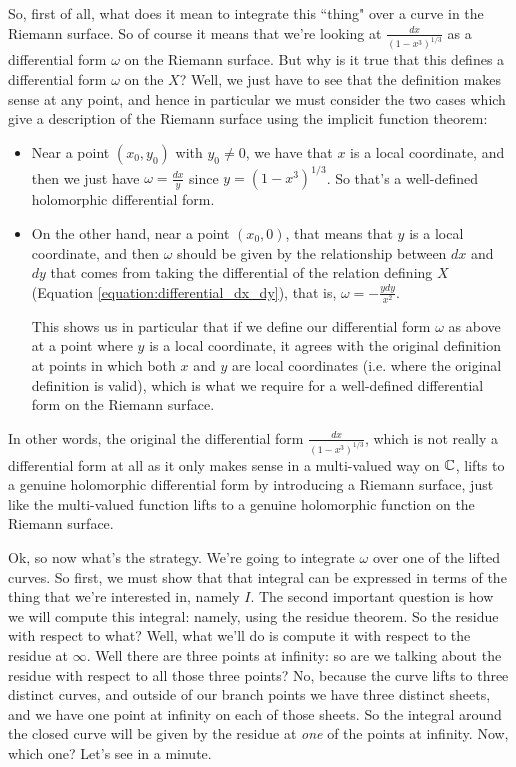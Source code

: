 \documentclass{article}
\begin{document}
So, first of all, what does it mean to integrate this ``thing" over a curve in the Riemann surface. So of course it means that we're looking at \(\frac{dx}{(1 - x^3)^{1/3}}\) as a differential form \(\omega\) on the Riemann surface. But why is it true that this defines a differential form \(\omega\) on the \(X\)? Well, we just have to see that the definition makes sense at any point, and hence in particular we must consider the two cases which give a description of the Riemann surface using the implicit function theorem:
\begin{itemize}

  \item Near a point \((x_0, y_0)\) with \(y_0 \neq 0\), we have that \(x\) is a local coordinate, and then we just have \(\omega = \frac{dx}{y}\) since \(y = (1 - x^3)^{1/3}\). So that's a well-defined holomorphic differential form.

  \item On the other hand, near a point \((x_0, 0)\), that means that \(y\) is a local coordinate, and then \(\omega\) should be given by the relationship between \(dx\) and \(dy\) that comes from taking the differential of the relation defining \(X\) (Equation \ref{equation:differential_dx_dy}), that is, \(\omega = -\frac{ydy}{x^2}\).

  This shows us in particular that if we define our differential form \(\omega\) as above at a point where \(y\) is a local coordinate, it agrees with the original definition at points in which both \(x\) and \(y\) are local coordinates (i.e. where the original definition is valid), which is what we require for a well-defined differential form on the Riemann surface.

\end{itemize}
In other words, the original the differential form \(\frac{dx}{(1 - x^3)^{1/3}}\), which is not really a differential form at all as it only makes sense in a multi-valued way on \(\mathbb{C}\), lifts to a genuine holomorphic differential form by introducing a Riemann surface, just like the multi-valued function lifts to a genuine holomorphic function on the Riemann surface.

Ok, so now what's the strategy. We're going to integrate \(\omega\) over one of the lifted curves. So first, we must show that that integral can be expressed in terms of the thing that we're interested in, namely \(I\). The second important question is how we will compute this integral: namely, using the residue theorem. So the residue with respect to what?  Well, what we'll do is compute it with respect to the residue at \(\infty\). Well there are three points at infinity: so are we talking about the residue with respect to all those three points? No, because the curve lifts to three distinct curves, and outside of our branch points we have three distinct sheets, and we have one point at infinity on each of those sheets. So the integral around the closed curve will be given by the residue at \textit{one} of the points at infinity. Now, which one? Let's see in a minute.
\end{document}
